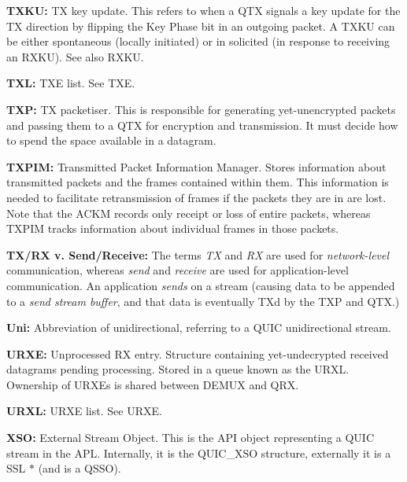 {\bfseries{TXKU\+:}} TX key update. This refers to when a QTX signals a key update for the TX direction by flipping the Key Phase bit in an outgoing packet. A TXKU can be either spontaneous (locally initiated) or in solicited (in response to receiving an RXKU). See also RXKU.

{\bfseries{TXL\+:}} TXE list. See TXE.

{\bfseries{TXP\+:}} TX packetiser. This is responsible for generating yet-\/unencrypted packets and passing them to a QTX for encryption and transmission. It must decide how to spend the space available in a datagram.

{\bfseries{TXPIM\+:}} Transmitted Packet Information Manager. Stores information about transmitted packets and the frames contained within them. This information is needed to facilitate retransmission of frames if the packets they are in are lost. Note that the ACKM records only receipt or loss of entire packets, whereas TXPIM tracks information about individual frames in those packets.

{\bfseries{TX/\+RX v. Send/\+Receive\+:}} The terms {\itshape TX} and {\itshape RX} are used for {\itshape network-\/level} communication, whereas {\itshape send} and {\itshape receive} are used for application-\/level communication. An application {\itshape sends} on a stream (causing data to be appended to a {\itshape send stream buffer}, and that data is eventually TX\textquotesingle{}d by the TXP and QTX.)

{\bfseries{Uni\+:}} Abbreviation of unidirectional, referring to a QUIC unidirectional stream.

{\bfseries{URXE\+:}} Unprocessed RX entry. Structure containing yet-\/undecrypted received datagrams pending processing. Stored in a queue known as the URXL. Ownership of URXEs is shared between DEMUX and QRX.

{\bfseries{URXL\+:}} URXE list. See URXE.

{\bfseries{XSO\+:}} External Stream Object. This is the API object representing a QUIC stream in the APL. Internally, it is the {\ttfamily QUIC\+\_\+\+XSO} structure, externally it is a {\ttfamily SSL \texorpdfstring{$\ast$}{*}} (and is a QSSO). 
